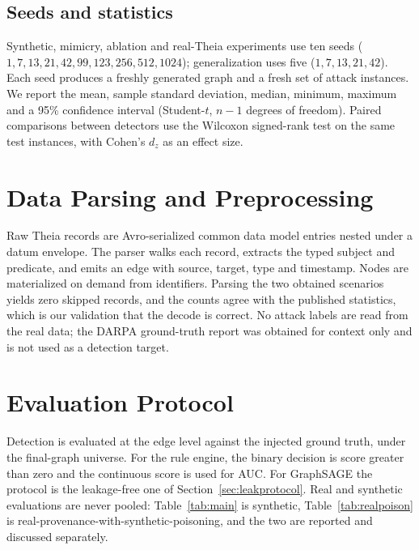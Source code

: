 \documentclass[journal]{IEEEtran}
\begin{document}
\subsection{Seeds and statistics}
Synthetic, mimicry, ablation and real-Theia experiments use ten seeds
($1,7,13,21,42,99,123,256,512,1024$); generalization uses five
($1,7,13,21,42$). Each seed produces a freshly generated graph and a fresh set
of attack instances. We report the mean, sample standard deviation, median,
minimum, maximum and a 95\% confidence interval (Student-$t$, $n-1$ degrees of
freedom). Paired comparisons between detectors use the Wilcoxon signed-rank test
on the same test instances, with Cohen's $d_z$ as an effect size.

\section{Data Parsing and Preprocessing}
Raw Theia records are Avro-serialized common data model entries nested under a
datum envelope. The parser walks each record, extracts the typed subject and
predicate, and emits an edge with source, target, type and timestamp. Nodes are
materialized on demand from identifiers. Parsing the two obtained scenarios
yields zero skipped records, and the counts agree with the published statistics,
which is our validation that the decode is correct. No attack labels are read
from the real data; the DARPA ground-truth report was obtained for context only
and is not used as a detection target.

\section{Evaluation Protocol}
\label{sec:evaluation}
Detection is evaluated at the edge level against the injected ground truth,
under the final-graph universe. For the rule engine, the binary decision is
score greater than zero and the continuous score is used for AUC. For GraphSAGE
the protocol is the leakage-free one of Section~\ref{sec:leakprotocol}. Real and
synthetic evaluations are never pooled: Table~\ref{tab:main} is synthetic,
Table~\ref{tab:realpoison} is real-provenance-with-synthetic-poisoning, and the
two are reported and discussed separately.
\end{document}
